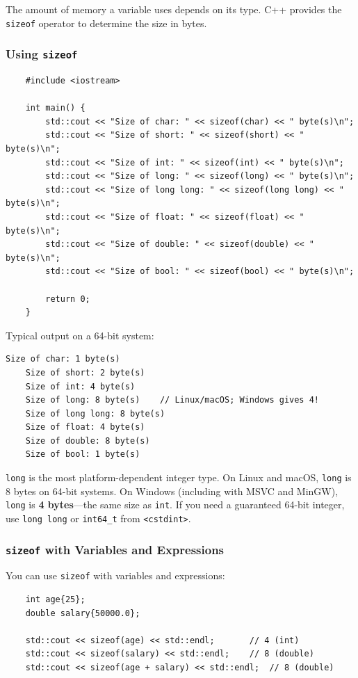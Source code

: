 The amount of memory a variable uses depends on its type. C++ provides the \texttt{sizeof} operator to determine the size in bytes.

\subsubsection{Using \texttt{sizeof}}

\begin{lstlisting}
	#include <iostream>
	
	int main() {
		std::cout << "Size of char: " << sizeof(char) << " byte(s)\n";
		std::cout << "Size of short: " << sizeof(short) << " byte(s)\n";
		std::cout << "Size of int: " << sizeof(int) << " byte(s)\n";
		std::cout << "Size of long: " << sizeof(long) << " byte(s)\n";
		std::cout << "Size of long long: " << sizeof(long long) << " byte(s)\n";
		std::cout << "Size of float: " << sizeof(float) << " byte(s)\n";
		std::cout << "Size of double: " << sizeof(double) << " byte(s)\n";
		std::cout << "Size of bool: " << sizeof(bool) << " byte(s)\n";
		
		return 0;
	}
\end{lstlisting}

Typical output on a 64-bit system:
\begin{lstlisting}[numbers=none]
	Size of char: 1 byte(s)
	Size of short: 2 byte(s)
	Size of int: 4 byte(s)
	Size of long: 8 byte(s)    // Linux/macOS; Windows gives 4!
	Size of long long: 8 byte(s)
	Size of float: 4 byte(s)
	Size of double: 8 byte(s)
	Size of bool: 1 byte(s)
\end{lstlisting}

\begin{remark}
	\texttt{long} is the most platform-dependent integer type. On Linux and macOS, \texttt{long} is 8 bytes on 64-bit systems. On Windows (including with MSVC and MinGW), \texttt{long} is \textbf{4 bytes}—the same size as \texttt{int}. If you need a guaranteed 64-bit integer, use \texttt{long long} or \texttt{int64\_t} from \texttt{<cstdint>}.
\end{remark}

\subsubsection{\texttt{sizeof} with Variables and Expressions}

You can use \texttt{sizeof} with variables and expressions:

\begin{lstlisting}
	int age{25};
	double salary{50000.0};
	
	std::cout << sizeof(age) << std::endl;       // 4 (int)
	std::cout << sizeof(salary) << std::endl;    // 8 (double)
	std::cout << sizeof(age + salary) << std::endl;  // 8 (double)
\end{lstlisting}

